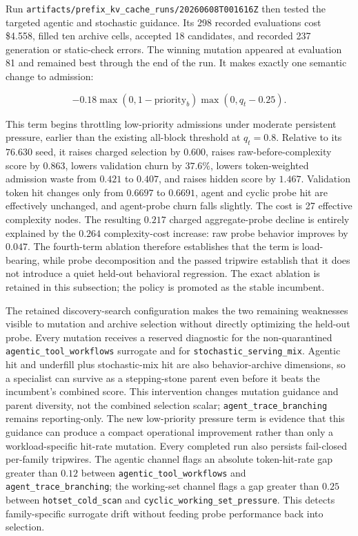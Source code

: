 \documentclass[11pt]{article}
\newcommand{\filepath}[1]{\nolinkurl{#1}}
\newcommand{\identifier}[1]{\nolinkurl{#1}}
\begin{document}
Run \filepath{artifacts/prefix_kv_cache_runs/20260608T001616Z} then tested the targeted
agentic and stochastic guidance.  Its 298 recorded evaluations cost \$4.558, filled
ten archive cells, accepted 18 candidates, and recorded 237 generation or static-check
errors.  The winning mutation appeared at evaluation 81 and remained best through the
end of the run.  It makes exactly one semantic change to admission:

\begin{equation}
  -0.18 \max(0, 1-\text{priority}_b)\max(0, q_t-0.25).
\end{equation}

This term begins throttling low-priority admissions under moderate persistent pressure,
earlier than the existing all-block threshold at \(q_t=0.8\).  Relative to its
\(76.630\) seed, it raises charged selection by \(0.600\), raises raw-before-complexity
score by \(0.863\), lowers validation churn by \(37.6\%\), lowers token-weighted
admission waste from \(0.421\) to \(0.407\), and raises hidden score by \(1.467\).
Validation token hit changes only from \(0.6697\) to \(0.6691\), agent and cyclic probe
hit are effectively unchanged, and agent-probe churn falls slightly.  The cost is 27
effective complexity nodes.  The resulting \(0.217\) charged aggregate-probe decline
is entirely explained by the \(0.264\) complexity-cost increase: raw probe behavior
improves by \(0.047\).  The fourth-term ablation therefore establishes that the term is
load-bearing, while probe decomposition and the passed tripwire establish that it does
not introduce a quiet held-out behavioral regression.  The exact ablation is retained
in this subsection; the policy is promoted as the stable incumbent.

The retained discovery-search configuration makes the two remaining weaknesses visible
to mutation
and archive selection without directly optimizing the held-out probe.  Every
mutation receives a reserved diagnostic for the non-quarantined
\identifier{agentic_tool_workflows} surrogate and for
\identifier{stochastic_serving_mix}.  Agentic hit and underfill plus stochastic-mix hit
are also behavior-archive dimensions, so a specialist can survive as a stepping-stone
parent even before it beats the incumbent's combined score.  This intervention changes
mutation guidance and parent diversity, not the combined selection scalar;
\identifier{agent_trace_branching} remains reporting-only.  The new low-priority
pressure term is evidence that this guidance can produce a compact operational
improvement rather than only a workload-specific hit-rate mutation. Every completed
run also persists fail-closed per-family tripwires.  The agentic channel flags an
absolute token-hit-rate gap greater than \(0.12\) between
\identifier{agentic_tool_workflows} and \identifier{agent_trace_branching}; the
working-set channel flags a gap greater than \(0.25\) between
\identifier{hotset_cold_scan} and \identifier{cyclic_working_set_pressure}.  This
detects family-specific surrogate drift without feeding probe performance back into
selection.
\end{document}
